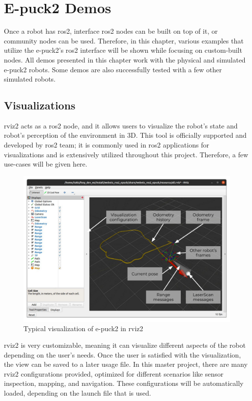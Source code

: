 \chapter{E-puck2 Demos}
\label{chap:demos}

Once a robot has \ac{ros2}, interface \ac{ros2} nodes can be built on top of it, or community nodes can be used. Therefore, in this chapter, various examples that utilize the e-puck2's \ac{ros2} interface will be shown while focusing on custom-built nodes. All demos presented in this chapter work with the physical and simulated e-puck2 robots. Some demos are also successfully tested with a few other simulated robots.

\section{Visualizations}
\acs{rviz2} acts as a \ac{ros2} node, and it allows users to visualize the robot's state and robot's perception of the environment in 3D. This tool is officially supported and developed by \ac{ros2} team; it is commonly used in \ac{ros2} applications for visualizations and is extensively utilized throughout this project. Therefore, a few use-cases will be given here.

\begin{figure}[H]
    \centering
    \includegraphics[width=\textwidth]{demos/figures/rviz.pdf}
    \caption{Typical visualization of e-puck2 in \acs{rviz2}}
    \label{fig:demos:rviz}
\end{figure}

\ac{rviz2} is very customizable, meaning it can visualize different aspects of the robot depending on the user's needs. Once the user is satisfied with the visualization, the view can be saved to a later usage file. In this master project, there are many \ac{rviz2} configurations provided, optimized for different scenarios like sensor inspection, mapping, and navigation. These configurations will be automatically loaded, depending on the launch file that is used.


